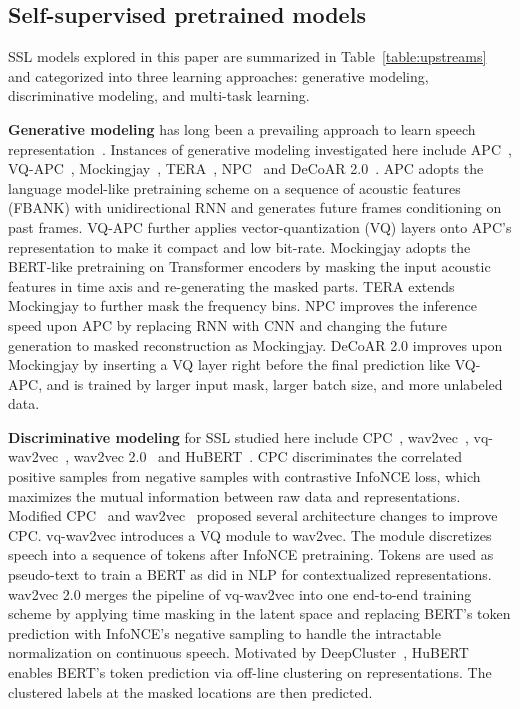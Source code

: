 \documentclass[a4paper]{article}
\begin{document}

\subsection{Self-supervised pretrained models}

SSL models explored in this paper are summarized in Table~\ref{table:upstreams} and categorized into three learning approaches: generative modeling, discriminative modeling, and multi-task learning.

\textbf{Generative modeling} has long been a prevailing approach to learn speech representation~\cite{apc1,mockingjay,decoar2}.
Instances of generative modeling investigated here include APC~\cite{apc1}, VQ-APC~\cite{vq_apc}, Mockingjay~\cite{mockingjay}, TERA~\cite{tera}, NPC~\cite{npc} and DeCoAR 2.0~\cite{decoar2}.
APC adopts the language model-like pretraining scheme on a sequence of acoustic features (FBANK) with unidirectional RNN and generates future frames conditioning on past frames.
VQ-APC further applies vector-quantization (VQ) layers onto APC's representation to make it compact and low bit-rate.
Mockingjay adopts the BERT-like pretraining on Transformer encoders by masking the input acoustic features in time axis and re-generating the masked parts.
TERA extends Mockingjay to further mask the frequency bins.
NPC improves the inference speed upon APC by replacing RNN with CNN and changing the future generation to masked reconstruction as Mockingjay.
DeCoAR 2.0 improves upon Mockingjay by inserting a VQ layer right before the final prediction like VQ-APC, and is trained by larger input mask, larger batch size, and more unlabeled data.

\textbf{Discriminative modeling} for SSL studied here include CPC~\cite{cpc,modified_cpc}, wav2vec~\cite{wav2vec}, vq-wav2vec~\cite{vq_wav2vec}, wav2vec 2.0~\cite{wav2vec2} and HuBERT~\cite{hsu2021hubert}.
CPC discriminates the correlated positive samples from negative samples with contrastive InfoNCE loss, which maximizes the mutual information between raw data and representations.
Modified CPC~\cite{modified_cpc} and wav2vec~\cite{wav2vec} proposed several architecture changes to improve CPC.
vq-wav2vec introduces a VQ module to wav2vec. The module discretizes speech into a sequence of tokens after InfoNCE pretraining.
Tokens are used as pseudo-text to train a BERT as did in NLP for contextualized representations.
wav2vec 2.0 merges the pipeline of vq-wav2vec into one end-to-end training scheme by applying time masking in the latent space and replacing BERT's token prediction with InfoNCE's negative sampling to handle the intractable normalization on continuous speech.
Motivated by DeepCluster~\cite{caron18deepcluster}, HuBERT~\cite{hsu2021hubert} enables BERT's token prediction via off-line clustering on representations.
The clustered labels at the masked locations are then predicted.
\end{document}
